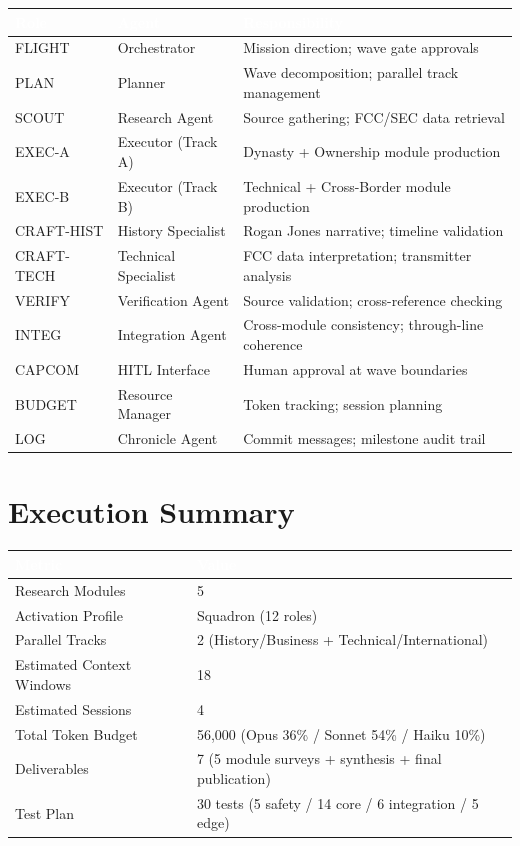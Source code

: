 \documentclass[11pt,letterpaper]{article}
\newcommand{\tableheader}[1]{\textbf{\sffamily\textcolor{white}{#1}}}
\begin{document}
\begin{center}
\begin{tabularx}{\textwidth}{L{2cm}L{2.5cm}X}
\toprule
{}
\tableheader{Role} & \tableheader{Agent} & \tableheader{Responsibility} \\
\midrule
FLIGHT & Orchestrator & Mission direction; wave gate approvals \\
PLAN & Planner & Wave decomposition; parallel track management \\
SCOUT & Research Agent & Source gathering; FCC/SEC data retrieval \\
EXEC-A & Executor (Track A) & Dynasty + Ownership module production \\
EXEC-B & Executor (Track B) & Technical + Cross-Border module production \\
CRAFT-HIST & History Specialist & Rogan Jones narrative; timeline validation \\
CRAFT-TECH & Technical Specialist & FCC data interpretation; transmitter analysis \\
VERIFY & Verification Agent & Source validation; cross-reference checking \\
INTEG & Integration Agent & Cross-module consistency; through-line coherence \\
CAPCOM & HITL Interface & Human approval at wave boundaries \\
BUDGET & Resource Manager & Token tracking; session planning \\
LOG & Chronicle Agent & Commit messages; milestone audit trail \\
\bottomrule
\end{tabularx}
\end{center}

\section{Execution Summary}

\begin{center}
\begin{tabularx}{\textwidth}{L{5cm}X}
\toprule
{}
\tableheader{Metric} & \tableheader{Value} \\
\midrule
Research Modules & 5 \\
Activation Profile & Squadron (12 roles) \\
Parallel Tracks & 2 (History/Business + Technical/International) \\
Estimated Context Windows & 18 \\
Estimated Sessions & 4 \\
Total Token Budget & 56,000 (Opus 36\% / Sonnet 54\% / Haiku 10\%) \\
Deliverables & 7 (5 module surveys + synthesis + final publication) \\
Test Plan & 30 tests (5 safety / 14 core / 6 integration / 5 edge) \\
\bottomrule
\end{tabularx}
\end{center}
\end{document}
